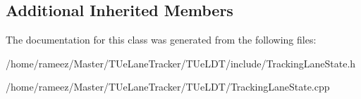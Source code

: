 \subsection*{Additional Inherited Members}


The documentation for this class was generated from the following files\-:\begin{DoxyCompactItemize}
\item 
/home/rameez/\-Master/\-T\-Ue\-Lane\-Tracker/\-T\-Ue\-L\-D\-T/include/Tracking\-Lane\-State.\-h\item 
/home/rameez/\-Master/\-T\-Ue\-Lane\-Tracker/\-T\-Ue\-L\-D\-T/Tracking\-Lane\-State.\-cpp\end{DoxyCompactItemize}
